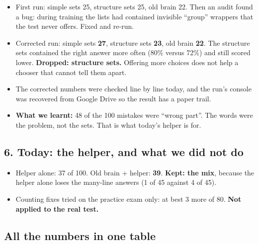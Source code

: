 \documentclass[11pt,a4paper]{article}
\begin{document}
\begin{itemize}[leftmargin=1.6em]
  \item First run: simple sets 25, structure sets 25, old brain 22. Then an audit found a bug: during training the lists had contained invisible ``group'' wrappers that the test never offers. Fixed and re-run.
  \item Corrected run: simple sets \textbf{27}, structure sets \textbf{23}, old brain \textbf{22}. The structure sets contained the right answer more often (80\% versus 72\%) and still scored lower. \textbf{Dropped: structure sets.} Offering more choices does not help a chooser that cannot tell them apart.
  \item The corrected numbers were checked line by line today, and the run's console was recovered from Google Drive so the result has a paper trail.
  \item \textbf{What we learnt:} 48 of the 100 mistakes were ``wrong part''. The words were the problem, not the sets. That is what today's helper is for.
\end{itemize}

\subsection*{6. Today: the helper, and what we did not do}

\begin{itemize}[leftmargin=1.6em]
  \item Helper alone: 37 of 100. Old brain + helper: \textbf{39}. \textbf{Kept: the mix}, because the helper alone loses the many-line answers (1 of 45 against 4 of 45).
  \item Counting fixes tried on the practice exam only: at best 3 more of 80. \textbf{Not applied to the real test.}
\end{itemize}

\subsection*{All the numbers in one table}
\end{document}
